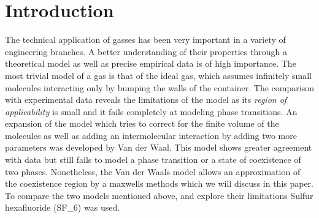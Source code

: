 \documentclass[a4paper,10pt,twocolumn]{article}
\begin{document}
    \section{Introduction}\label{sec:introdction}
    The technical application of gasses has been very important in a variety of engineering branches. 
    A better understanding of their properties through a  theoretical model as well as precise empirical data is of high importance.
    The most trivial model of a gas is that of the ideal gas, which assumes infinitely small molecules interacting only by bumping the walls of the container.
    The comparison with experimental data reveals the limitations of the model as its \textit{region of applicability} is small and it fails completely at modeling phase transitions.
    An expansion of the model which tries to correct for the finite volume of the molecules as well as adding an intermolecular interaction by adding two more parameters was developed by Van der Waal.
    This model shows greater agreement with data but still fails to model a phase transition or a state of coexistence of two phases.
    Nonetheless, the Van der Waals model allows an approximation of the coexistence region by a maxwells methods which we will discuss in this paper.
    To compare the two models mentioned above, and explore their limitations Sulfur hexafluoride (SF_6\)) was used.
    
\end{document}
